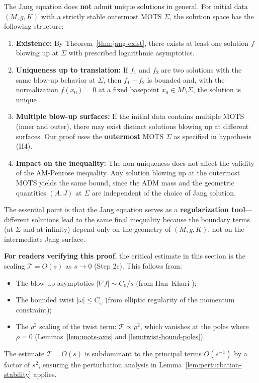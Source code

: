 \begin{remark}\label{rem:jang-uniqueness}
The Jang equation does \textbf{not} admit unique solutions in general. For initial data $(M, g, K)$ with a strictly stable outermost MOTS $\Sigma$, the solution space has the following structure:
\begin{enumerate}
    \item \textbf{Existence:} By Theorem~\ref{thm:jang-exist}, there exists at least one solution $f$ blowing up at $\Sigma$ with prescribed logarithmic asymptotics.
    
    \item \textbf{Uniqueness up to translation:} If $f_1$ and $f_2$ are two solutions with the same blow-up behavior at $\Sigma$, then $f_1 - f_2$ is bounded and, with the normalization $f(x_0) = 0$ at a fixed basepoint $x_0 \in M \setminus \Sigma$, the solution is unique \cite[Theorem 3.1]{hankhuri2013}.
    
    \item \textbf{Multiple blow-up surfaces:} If the initial data contains multiple MOTS (inner and outer), there may exist distinct solutions blowing up at different surfaces. Our proof uses the \textbf{outermost} MOTS $\Sigma$ as specified in hypothesis (H4).
    
    \item \textbf{Impact on the inequality:} The non-uniqueness does not affect the validity of the AM-Penrose inequality. Any solution blowing up at the outermost MOTS yields the same bound, since the ADM mass and the geometric quantities $(A, J)$ at $\Sigma$ are independent of the choice of Jang solution.
\end{enumerate}
The essential point is that the Jang equation serves as a \textbf{regularization tool}---different solutions lead to the same final inequality because the boundary terms (at $\Sigma$ and at infinity) depend only on the geometry of $(M, g, K)$, not on the intermediate Jang surface.
\end{remark}

\begin{remark}\label{rem:verification-jang}
\textbf{For readers verifying this proof}, the critical estimate in this section is the scaling $\mathcal{T} = O(s)$ as $s \to 0$ (Step 2c). This follows from:
\begin{itemize}
    \item The blow-up asymptotics $|\nabla f| \sim C_0/s$ (from Han--Khuri \cite[Prop.~4.5]{hankhuri2013});
    \item The bounded twist $|\omega| \leq C_\omega$ (from elliptic regularity of the momentum constraint);
    \item The $\rho^2$ scaling of the twist term: $\mathcal{T} \propto \rho^2$, which vanishes at the poles where $\rho = 0$ (Lemmas~\ref{lem:mots-axis} and \ref{lem:twist-bound-poles}).
\end{itemize}
The estimate $\mathcal{T} = O(s)$ is subdominant to the principal terms $O(s^{-1})$ by a factor of $s^2$, ensuring the perturbation analysis in Lemma~\ref{lem:perturbation-stability} applies.
\end{remark}

